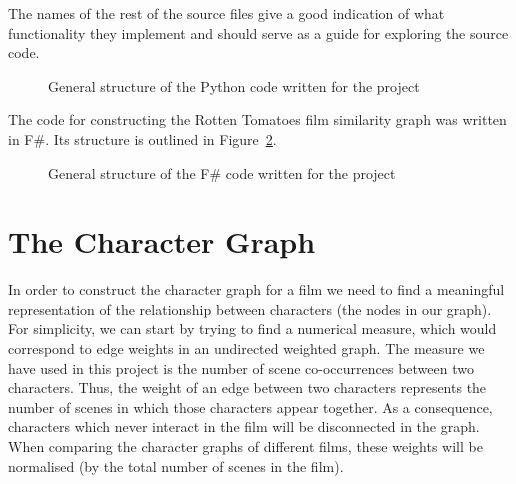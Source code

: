 \documentclass[bsc,frontabs,singlespacing,parskip]{infthesis} %
\begin{document}
The names of the rest of the source files give a good indication of what functionality they implement and should serve as a guide for exploring the source code.

\hspace{.1in}
\begin{figure}[ht!]
\caption{General structure of the Python code written for the project}
\label{fig:dirtree}
\end{figure}

The code for constructing the Rotten Tomatoes film similarity graph was written in F\#. Its structure is outlined in Figure~\ref{fig:fsharpdirtree}.

\begin{figure}[th!]
\caption{General structure of the F\# code written for the project}
\label{fig:fsharpdirtree}
\end{figure}

\section{The Character Graph}
In order to construct the character graph for a film we need to find a meaningful representation of the relationship between characters (the nodes in our graph). For simplicity, we can start by trying to find a numerical measure, which would correspond to edge weights in an undirected weighted graph. The measure we have used in this project is the number of scene co-occurrences between two characters. Thus, the weight of an edge between two characters represents the number of scenes in which those characters appear together. As a consequence, characters which never interact in the film will be disconnected in the graph. When comparing the character graphs of different films, these weights will be normalised (by the total number of scenes in the film).
\end{document}
